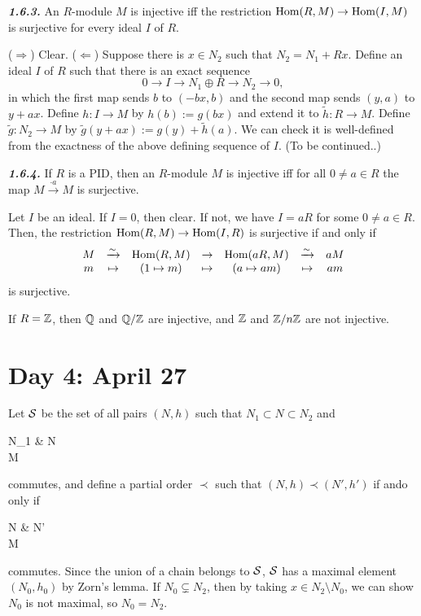 \documentclass{../../../small}
\begin{document}
\begin{prop*}\hspace{-5pt}\textbf{\emph{1.6.3.}}
An $R$-module $M$ is injective iff the restriction $\operatorname{Hom}(R,M)\to\operatorname{Hom}(I,M)$ is surjective for every ideal $I$ of $R$.
\end{prop*}
\begin{pf}
($\Rightarrow$) Clear.
($\Leftarrow$) Suppose there is $x\in N_2$ such that $N_2=N_1+Rx$.
Define an ideal $I$ of $R$ such that there is an exact sequence
\[0 \to I \to N_1\oplus R \to N_2 \to 0,\]
in which the first map sends $b$ to $(-bx,b)$ and the second map sends $(y,a)$ to $y+ax$.
Define $h:I\to M$ by $h(b):=g(bx)$ and extend it to $\tilde h:R\to M$.
Define $\tilde g:N_2\to M$ by $\tilde g(y+ax):=g(y)+\tilde h(a)$.
We can check it is well-defined from the exactness of the above defining sequence of $I$.
(To be continued..)
\end{pf}

\begin{cor*}\hspace{-5pt}\textbf{\emph{1.6.4.}}
If $R$ is a PID, then an $R$-module $M$ is injective iff for all $0\ne a\in R$ the map $M\xrightarrow{\cdot a}M$ is surjective.
\end{cor*}
\begin{pf}
Let $I$ be an ideal.
If $I=0$, then clear.
If not, we have $I=aR$ for some $0\ne a\in R$.
Then, the restriction $\operatorname{Hom}(R,M)\to\operatorname{Hom}(I,R)$ is surjective if and only if
\[\begin{array}{ccccccc}
M&\xrightarrow{\sim}&\operatorname{Hom}(R,M)&\to&\operatorname{Hom}(aR,M)&\xrightarrow{\sim}&aM\\
m&\mapsto&(1\mapsto m)&\mapsto&(a\mapsto am)&\mapsto&am
\end{array}\]
is surjective.
\end{pf}

\begin{ex*}
If $R=\mathbb{Z}$, then $\mathbb{Q}$ and $\mathbb{Q}/\mathbb{Z}$ are injective, and $\mathbb{Z}$ and $\mathbb{Z}/n\mathbb{Z}$ are not injective.
\end{ex*}



\newpage
\section{Day 4: April 27}

\begin{pf}[Proof of 1.6.3.]
Let $\mathcal{S}$ be the set of all pairs $(N,h)$ such that $N_1\subset N\subset N_2$ and
\begin{cd}
N_1  & N\\
M
\end{cd}
commutes, and define a partial order $\prec$ such that $(N,h)\prec(N',h')$ if ando only if
\begin{cd}
N  & N'\\
M
\end{cd}
commutes.
Since the union of a chain belongs to $\mathcal{S}$, $\mathcal{S}$ has a maximal element $(N_0,h_0)$ by Zorn's lemma.
If $N_0\subsetneq N_2$, then by taking $x\in N_2\setminus N_0$, we can show $N_0$ is not maximal, so $N_0=N_2$.
\end{pf}
\end{document}
